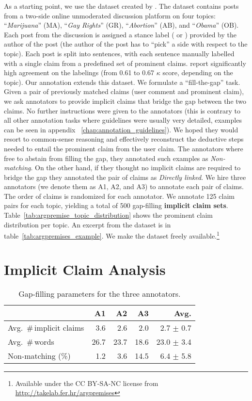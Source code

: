 As a starting point, we use the dataset created by
\citet{hasan2014you}. 
The dataset contains posts from a two-side online unmoderated discussion platform 
on four topics: ``\emph{Marijuana}'' (MA), ``\emph{Gay Rights}'' (GR), 
``\emph{Abortion}'' (AB), and ``\emph{Obama}'' (OB).
Each post from the discussion is assigned a stance label ( or ) 
provided by the author of the post (the author of the post has to ``pick'' a side 
with respect to the topic). 
Each post is split into sentences, with each sentence manually
labelled with a single claim from a predefined set of prominent
claims. 
\citet{hasan2014you} report significantly high agreement on the labelings
(from 0.61 to 0.67 $\kappa$ score, depending on the topic). 
Our annotation extends this dataset. 
We formulate a ``fill-the-gap'' task. 
Given a pair of previously matched claims (user comment and 
prominent claim), we ask annotators to provide implicit claims that bridge the gap 
between the two claims. 
No further instructions were given to the annotators (this is contrary to all other
annotation tasks where guidelines were usually very detailed, examples can be seen in appendix
~\ref{chap:annotation_guidelines}). 
We hoped they would resort to common-sense reasoning and effectively 
reconstruct the deductive steps needed to entail the prominent claim from the user
claim.
The annotators where free to abstain from filling the gap, they
annotated such examples as \emph{Non-matching}. 
On the other hand, if they thought no implicit claims are required
to bridge the gap they annotated the pair of claims as \emph{Directly linked}. 
We hire three annotators (we denote them as A1, A2, and A3) to annotate each pair of claims. 
The order of claims is randomized for each annotator. 
We annotate 125 claim pairs for each topic, yielding a total of 500 gap-filling
\textbf{implicit claim sets}. 
Table~\ref{tab:argpremise_topic_distribution} shows the prominent claim distribution per topic. 
An excerpt from the dataset is in table~\ref{tab:argpremises_example}. 
We make the dataset freely available.\footnote{Available under the CC BY-SA-NC license from
\url{http://takelab.fer.hr/argpremises}}

\section{Implicit Claim Analysis}

\begin{table}[t]
{\small
\begin{center}
\begin{tabular}{lrrrr}
\toprule
& A1 & A2 & A3 & Avg.\\
\midrule
Avg.~\#\,implicit claims  & 3.6  & 2.6   & 2.0   &  \phantom{0}2.7 $\pm$ 0.7  \\
Avg.~\#\,words     & 26.7 & 23.7  & 18.6  &  23.0 $\pm$ 3.4      \\
Non-matching (\%)     & 1.2  & 3.6   & 14.5  &  \phantom{0}6.4 $\pm$ 5.8  \\
\bottomrule
\end{tabular}
\caption{Gap-filling parameters for the three annotators.}
\label{tab:var-annotators}
\end{center}}
\end{table}


